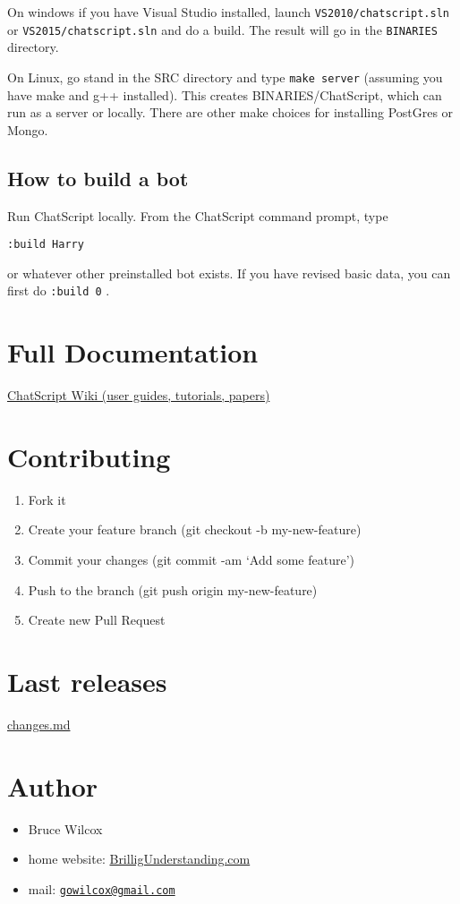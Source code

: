 \documentclass[]{article}
\providecommand{\tightlist}{%
  \setlength{\itemsep}{0pt}\setlength{\parskip}{0pt}}
\begin{document}
On windows if you have Visual Studio installed, launch
\texttt{VS2010/chatscript.sln} or \texttt{VS2015/chatscript.sln} and do
a build. The result will go in the \texttt{BINARIES} directory.

On Linux, go stand in the SRC directory and type \texttt{make\ server}
(assuming you have make and g++ installed). This creates
BINARIES/ChatScript, which can run as a server or locally. There are
other make choices for installing PostGres or Mongo.

\subsection{How to build a bot}\label{how-to-build-a-bot}

Run ChatScript locally. From the ChatScript command prompt, type

\begin{verbatim}
:build Harry
\end{verbatim}

or whatever other preinstalled bot exists. If you have revised basic
data, you can first do \texttt{:build\ 0} .

\section{Full Documentation}\label{full-documentation}

\href{/WIKI/README.md}{ChatScript Wiki (user guides, tutorials, papers)}

\section{Contributing}\label{contributing}

\begin{enumerate}
\def\labelenumi{\arabic{enumi}.}
\tightlist
\item
  Fork it
\item
  Create your feature branch (git checkout -b my-new-feature)
\item
  Commit your changes (git commit -am `Add some feature')
\item
  Push to the branch (git push origin my-new-feature)
\item
  Create new Pull Request
\end{enumerate}

\section{Last releases}\label{last-releases}

\href{/changes.md}{changes.md}

\section{Author}\label{author}

\begin{itemize}
\tightlist
\item
  Bruce Wilcox
\item
  home website:
  \href{http://www.brilligunderstanding.com}{BrilligUnderstanding.com}
\item
  mail: \href{mailto:gowilcox@gmail.com}{\nolinkurl{gowilcox@gmail.com}}
\end{itemize}
\end{document}
